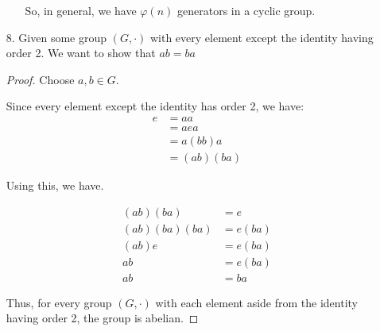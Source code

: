 \documentclass[12pt,letterpaper]{article}
\begin{document}
\begin{enumerate}
\begin{enumerate}
          So, in general, we have $\varphi(n)$ generators in a cyclic group.
      \end{enumerate}

    \item[8.]
      Given some group $(G, \cdot)$ with every element except the identity having order 2.
      We want to show that $ab = ba$

      \begin{proof}
        Choose $a, b \in G$.

        Since every element except the identity has order 2, we have:
        \begin{align*}
          e &= aa \\
          &= aea \\
          &= a(bb)a \\
          &= (ab)(ba)
        \end{align*}

        Using this, we have.

        \begin{align*}
          (ab)(ba) &= e \\
          (ab)(ba)(ba) &= e(ba) \\
          (ab)e &= e(ba) \\
          ab &= e(ba) \\
          ab &= ba
        \end{align*}

        Thus, for every group $(G, \cdot)$ with each element aside from the identity having order 2,
        the group is abelian.
      \end{proof}
  \end{enumerate}
\end{document}
